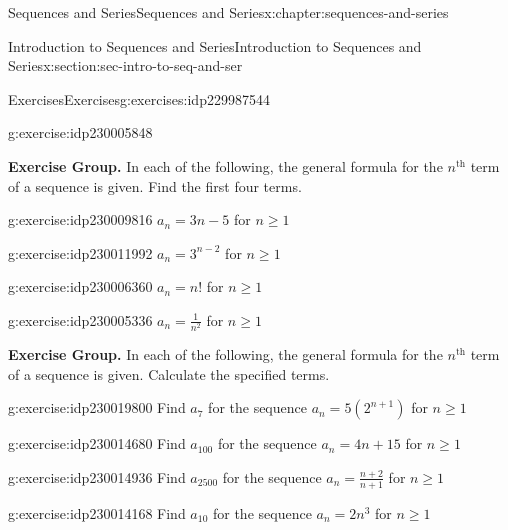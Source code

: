 \documentclass[twoside,10pt,]{book}
\numberwithin{equation}{section}
\newcommand{\nth}{{n^{\text{th}}}}
\begin{document}
\begin{chapterptx}{Sequences and Series}{}{Sequences and Series}{}{}{x:chapter:sequences-and-series}
\begin{sectionptx}{Introduction to Sequences and Series}{}{Introduction to Sequences and Series}{}{}{x:section:sec-intro-to-seq-and-ser}
\begin{exercises-subsection}{Exercises}{}{Exercises}{}{}{g:exercises:idp229987544}
\begin{exercisegroup}
\begin{divisionexerciseeg}{16}{}{}{g:exercise:idp230005848}
\end{divisionexerciseeg}%
\end{exercisegroup}
\par\medskip\noindent
\par\medskip\noindent%
\textbf{Exercise Group.}\space\space%
In each of the following, the general formula for the \(\nth{}\) term of a sequence is given.  Find the first four terms.\begin{exercisegroup}
\begin{divisionexerciseeg}{17}{}{}{g:exercise:idp230009816}%
\(a_n = 3n - 5\) for \(n \ge 1\)\end{divisionexerciseeg}%
\begin{divisionexerciseeg}{18}{}{}{g:exercise:idp230011992}%
\(a_n = 3^{n - 2}\) for \(n \ge 1\)\end{divisionexerciseeg}%
\begin{divisionexerciseeg}{19}{}{}{g:exercise:idp230006360}%
\(a_n = n!\) for \(n \ge 1\)\end{divisionexerciseeg}%
\begin{divisionexerciseeg}{20}{}{}{g:exercise:idp230005336}%
\(a_n = \frac{1}{n^2}\) for \(n \ge 1\)\end{divisionexerciseeg}%
\end{exercisegroup}
\par\medskip\noindent
\par\medskip\noindent%
\textbf{Exercise Group.}\space\space%
In each of the following, the general formula for the \(\nth{}\) term of a sequence is given.  Calculate the specified terms.\begin{exercisegroup}
\begin{divisionexerciseeg}{21}{}{}{g:exercise:idp230019800}%
Find \(a_7\) for the sequence \(a_n = 5\left( 2^{n + 1} \right)\) for \(n \ge 1\)\end{divisionexerciseeg}%
\begin{divisionexerciseeg}{22}{}{}{g:exercise:idp230014680}%
Find \(a_{100}\) for the sequence \(a_n = 4n + 15\) for \(n \ge 1\)\end{divisionexerciseeg}%
\begin{divisionexerciseeg}{23}{}{}{g:exercise:idp230014936}%
Find \(a_{2500}\) for the sequence \(a_n = \frac{n + 2}{n + 1}\) for \(n \ge 1\)\end{divisionexerciseeg}%
\begin{divisionexerciseeg}{24}{}{}{g:exercise:idp230014168}%
Find \(a_{10}\) for the sequence \(a_n = 2n^3\) for \(n \ge 1\)\end{divisionexerciseeg}%

\end{exercisegroup}
\end{exercises-subsection}
\end{sectionptx}
\end{chapterptx}
\end{document}

